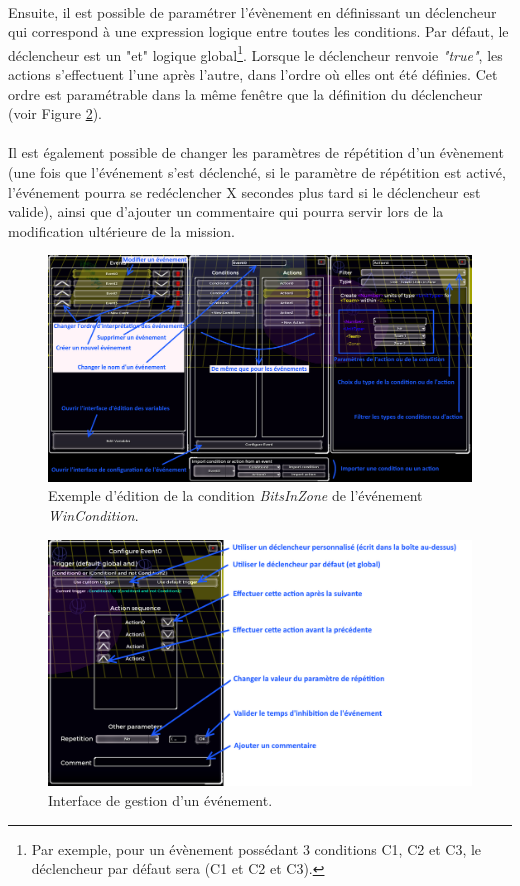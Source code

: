 \documentclass[a4paper]{article}
\begin{document}
\paragraph{ }
Ensuite, il est possible de paramétrer l'évènement en définissant un déclencheur qui correspond à une expression logique entre toutes les conditions. Par défaut, le déclencheur est un "et" logique global\footnote{Par exemple, pour un évènement possédant 3 conditions C1, C2 et C3, le déclencheur par défaut sera (C1 et C2 et C3).}. Lorsque le déclencheur renvoie \textit{"true"}, les actions s'effectuent l'une après l'autre, dans l'ordre où elles ont été définies. Cet ordre est paramétrable dans la même fenêtre que la définition du déclencheur (voir Figure \ref{fig:editor-eventconfig}).
\paragraph{ }
Il est également possible de changer les paramètres de répétition d'un évènement (une fois que l'événement s'est déclenché, si le paramètre de répétition est activé, l'événement pourra se redéclencher X secondes plus tard si le déclencheur est valide), ainsi que d'ajouter un commentaire qui pourra servir lors de la modification ultérieure de la mission.
\begin{figure}[H]
\centering
\includegraphics[width=\linewidth]{editor-trigger.png}
\caption{Exemple d'édition de la condition \textit{BitsInZone} de l'événement \textit{WinCondition}.}
\label{fig:editor-trigger}
\end{figure}
\begin{figure}[H]
\centering
\includegraphics[width=\linewidth]{editor-eventconfig.png}
\caption{Interface de gestion d'un événement.}
\label{fig:editor-eventconfig}
\end{figure}
\end{document}
